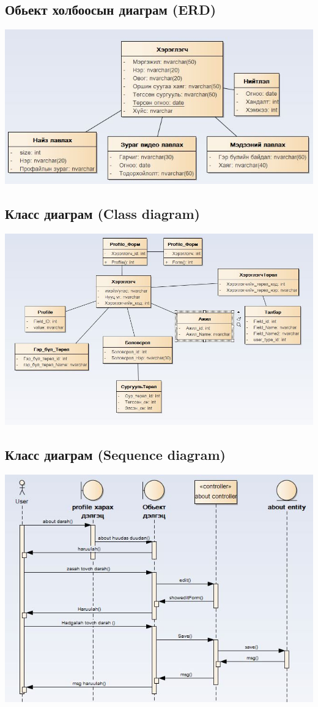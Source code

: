 \documentclass[]{article}
\begin{document}
\subsection{Обьект холбоосын диаграм (ERD)}
\includegraphics[width=\textwidth]{ERD}
\subsection{Класс диаграм (Class diagram)}
\includegraphics[width=\textwidth]{CLASS}
\subsection{Класс диаграм (Sequence diagram)}
\includegraphics[width=\textwidth]{seq1}
\end{document}
